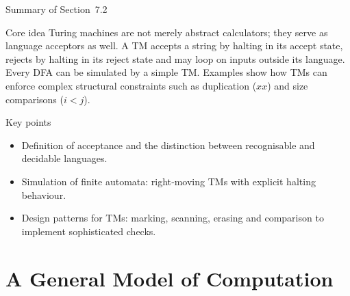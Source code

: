 \begin{frame}[t]{Summary of Section 7.2}
  \begin{tblock}{Core idea}
    Turing machines are not merely abstract calculators; they serve as
    language acceptors as well.  A TM accepts a string by halting in
    its accept state, rejects by halting in its reject state and may
    loop on inputs outside its language.  Every DFA can be simulated
    by a simple TM.  Examples show how TMs can enforce complex
    structural constraints such as duplication ($xx$) and size
    comparisons ($i<j$).
  \end{tblock}
  \begin{tblock}{Key points}
    \begin{itemize}
      \item Definition of acceptance and the distinction between
        recognisable and decidable languages.
      \item Simulation of finite automata: right‑moving TMs with
        explicit halting behaviour.
      \item Design patterns for TMs: marking, scanning, erasing and
        comparison to implement sophisticated checks.
    \end{itemize}
  \end{tblock}
  \label{fr:7.2-14}
\end{frame}

%

\section{A General Model of Computation}

